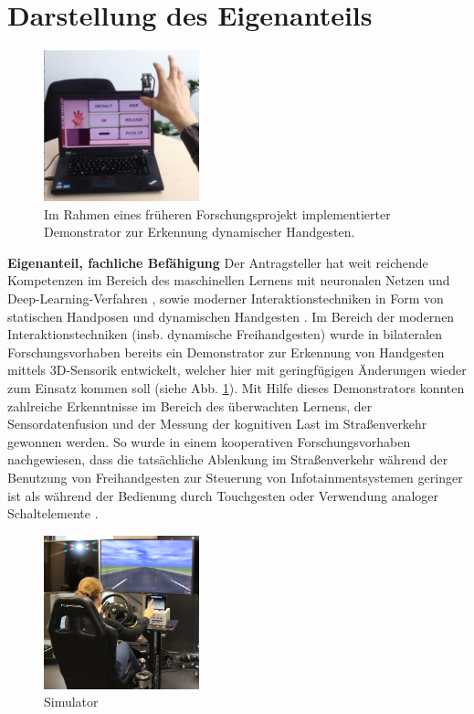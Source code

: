 \documentclass[11pt]{article}
\begin{document}
\section{Darstellung des Eigenanteils}\label{sec:eigen}
%
\begin{figure}[ht]
  \centering
  \includegraphics[width=0.4\textwidth]{images/s1.png}
  \caption{Im Rahmen eines früheren Forschungsprojekt implementierter Demonstrator zur Erkennung dynamischer Handgesten.}
  \label{fig:demo}
\end{figure}
%
\textbf{Eigenanteil, fachliche Befähigung} Der Antragsteller hat weit reichende Kompetenzen im Bereich des maschinellen Lernens mit neuronalen Netzen und Deep-Learning-Verfahren \cite{gepperth2018a,gepperth2018c,gepperth2017b}, sowie moderner Interaktionstechniken in Form von statischen Handposen und dynamischen Handgesten \cite{gepperth2017d,kopinski2016x3}. Im Bereich der modernen Interaktionstechniken (insb. dynamische Freihandgesten) wurde in bilateralen Forschungsvorhaben bereits ein Demonstrator zur Erkennung von Handgesten mittels 3D-Sensorik entwickelt, welcher hier mit geringfügigen Änderungen wieder zum Einsatz kommen soll (siehe Abb. \ref{fig:demo}). Mit Hilfe dieses Demonstrators konnten zahlreiche Erkenntnisse im Bereich des überwachten Lernens, der Sensordatenfusion und der Messung der kognitiven Last im Straßenverkehr gewonnen werden. So wurde in einem kooperativen Forschungsvorhaben nachgewiesen, dass die tatsächliche Ablenkung im Straßenverkehr während der Benutzung von Freihandgesten zur Steuerung von Infotainmentsystemen geringer ist als während der Bedienung durch Touchgesten oder Verwendung analoger Schaltelemente \cite{kopinski2016touch}.
%
\begin{figure}[ht]
  \centering
  \includegraphics[width=0.4\textwidth]{images/simulator.png}
  \caption{Simulator}
  \label{fig1}
\end{figure}
\end{document}
